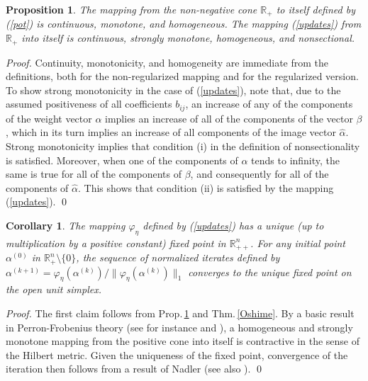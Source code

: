 \documentclass{article}
\newcommand{\mR}{\mathbb{R}}
\renewcommand{\phi}{\varphi}
\newcommand{\ki}{^{(k)}}
\newcommand{\kn}{^{(k+1)}}
\newcommand{\preg}{\phi_\eta}
\newcommand{\ed}[1]{{\rm #1}}
\newtheorem{corollary}[theorem]{Corollary}
\newtheorem{proposition}[theorem]{Proposition}
\theoremstyle{definition}
\begin{document}
\begin{proposition} \label{lemma2}
The mapping from the non-negative cone $\mR_+$ to itself defined by \ed{(\ref{pot})} is continuous, monotone, and homogeneous. The mapping \ed{(\ref{updates})} from $\mR_+$ into itself is continuous, strongly monotone, homogeneous, and nonsectional.
\end{proposition}

\begin{proof}
Continuity, monotonicity, and homogeneity are immediate from the definitions, both for the non-regularized mapping and for the regularized version. To show strong monotonicity in the case of (\ref{updates}), note that, due to the assumed positiveness of all coefficients $b_{ij}$, an increase of any of the components of the weight vector $\alpha$ implies an increase of all of the components of the vector $\beta$, which in its turn implies an increase of all components of the image vector $\hat{\alpha}$. Strong monotonicity implies that condition (i) in the definition of nonsectionality is satisfied. Moreover, when one of the components of $\alpha$ tends to infinity, the same is true for all of the components of $\beta$, and consequently for all of the components of $\hat{\alpha}$. This shows that condition (ii) is satisfied by the mapping (\ref{updates}).
\qed
\end{proof}

\begin{corollary}
The mapping $\phi_{\eta}$ defined by \ed{(\ref{updates})} has a unique (up to multiplication by a positive constant) fixed point in $\mR^n_{++}$. For any initial point $\alpha^{(0)}$ in $\mR^n_+\setminus\{0\}$, the sequence of normalized iterates defined by $\alpha\kn = \preg(\alpha\ki)/\|\preg(\alpha\ki)\|_1$ converges to the unique fixed point on the open unit simplex.
\end{corollary}

\begin{proof}
The first claim follows from Prop.\,\ref{lemma2} and Thm.\,\ref{Oshime}. By a basic result in Perron-Frobenius theory (see for instance \cite[Ch.\,2]{Lemmens} and \cite[Lemma 4.4]{PSW1}), a homogeneous and strongly monotone mapping from the positive cone into itself is contractive in the sense of the Hilbert metric. Given the uniqueness of the fixed point, convergence of the iteration then follows from a result of Nadler \cite{Nadler} (see also \cite[Cor.\,5.4]{PSW1}).
\qed
\end{proof}
\end{document}
